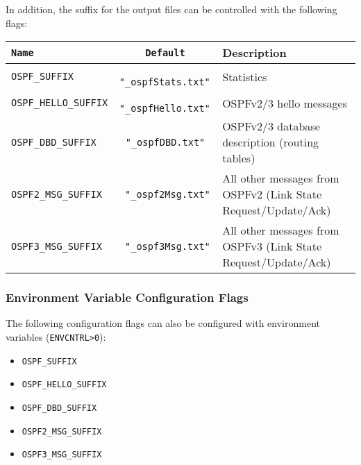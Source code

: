\documentclass[documentation]{subfiles}
\begin{document}
In addition, the suffix for the output files can be controlled with the following flags:

\begin{longtable}{>{\tt}l>{\tt\small}cl}
    \toprule
    {\bf Name}          & {\bf Default}     & {\bf Description}\\
    \midrule\endhead%
    OSPF\_SUFFIX        & "\_ospfStats.txt" & Statistics\\
    OSPF\_HELLO\_SUFFIX & "\_ospfHello.txt" & OSPFv2/3 hello messages\\
    OSPF\_DBD\_SUFFIX   & "\_ospfDBD.txt"   & OSPFv2/3 database description (routing tables)\\
    OSPF2\_MSG\_SUFFIX  & "\_ospf2Msg.txt"  & All other messages from OSPFv2 (Link State Request/Update/Ack)\\
    OSPF3\_MSG\_SUFFIX  & "\_ospf3Msg.txt"  & All other messages from OSPFv3 (Link State Request/Update/Ack)\\
    \bottomrule
\end{longtable}

\subsubsection{Environment Variable Configuration Flags}
The following configuration flags can also be configured with environment variables ({\tt ENVCNTRL>0}):
\begin{itemize}
    \item {\tt OSPF\_SUFFIX}
    \item {\tt OSPF\_HELLO\_SUFFIX}
    \item {\tt OSPF\_DBD\_SUFFIX}
    \item {\tt OSPF2\_MSG\_SUFFIX}
    \item {\tt OSPF3\_MSG\_SUFFIX}
\end{itemize}
\end{document}
